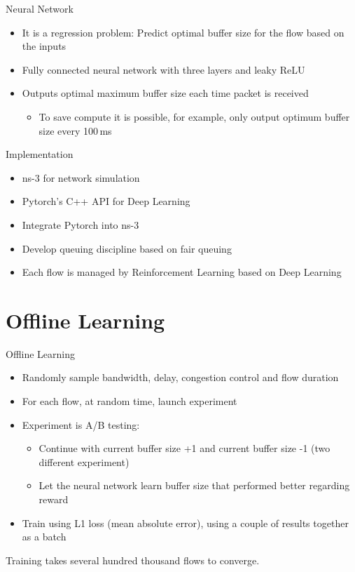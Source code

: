 \documentclass[xcolor={dvipsnames}]{beamer}
\begin{document}
\begin{frame}{Neural Network}
\begin{itemize}
\item It is a regression problem: Predict optimal buffer size for the flow based on the inputs
\item Fully connected neural network with three layers and leaky ReLU
\item Outputs optimal maximum buffer size each time packet is received
\begin{itemize}
\item To save compute it is possible, for example, only output optimum buffer size every 100\,ms
\end{itemize}
\end{itemize}
\end{frame}

\begin{frame}{Implementation}
\begin{itemize}
\item ns-3 for network simulation
\item Pytorch's C++ API for Deep Learning
\item Integrate Pytorch into ns-3
\item Develop queuing discipline based on fair queuing
\item Each flow is managed by Reinforcement Learning based on Deep Learning
\end{itemize}
\end{frame}

\section{Offline Learning}
\begin{frame}{Offline Learning}
\begin{itemize}
\item Randomly sample bandwidth, delay, congestion control and flow duration
\item For each flow, at random time, launch experiment
\item Experiment is A/B testing: 
\begin{itemize}
\item Continue with current buffer size +1 and current buffer size -1 (two different experiment)
\item Let the neural network learn buffer size that performed better regarding reward
\end{itemize}
\item Train using L1 loss (mean absolute error), using a couple of results together as a batch
\end{itemize}
Training takes several hundred thousand flows to converge. 
\end{frame}
\end{document}
